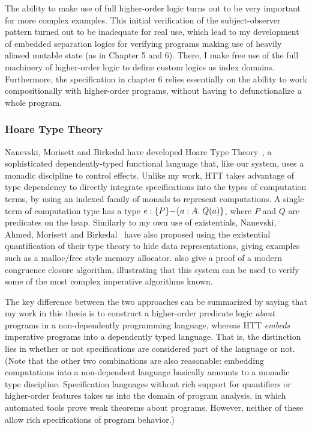 The ability to make use of full higher-order logic turns out to be
very important for more complex examples. This initial verification of
the subject-observer pattern turned out to be inadequate for real use,
which lead to my development of embedded separation logics for
verifying programs making use of heavily aliased mutable state (as in
Chapter 5 and 6). There, I make free use of the full machinery of
higher-order logic to define custom logics as index
domains. Furthermore, the specification in chapter 6 relies
essentially on the ability to work compositionally with higher-order
programs, without having to defunctionalize a whole program.

\subsubsection{Hoare Type Theory}

Nanevski, Morisett and Birkedal have developed Hoare Type
Theory~\cite{htt, nanevski08}, a sophisticated dependently-typed
functional language that, like our system, uses a monadic discipline
to control effects.  Unlike my work, HTT takes advantage of type
dependency to directly integrate specifications into the types of
computation terms, by using an indexed family of monads to represent
computations. A single term of computation type has a type $e :
\{{P}\}{-}\{{a:A}.\;{Q(a)}\}$, where $P$ and $Q$ are predicates on the heap.
Similarly to my own use of existentials, Nanevski, Ahmed, Morisett and
Birkedal~\cite{abstract-htt} have also proposed using the existential
quantification of their type theory to hide data representations,
giving examples such as a malloc/free style memory
allocator. \citet{nanevski-victor-10} also give a proof of a modern
congruence closure algorithm, illustrating that this system can be
used to verify some of the most complex imperative algorithms known.

The key difference between the two approaches can be summarized by
saying that my work in this thesis is to construct a higher-order
predicate logic \emph{about} programs in a non-dependently programming
language, whereas HTT \emph{embeds} imperative programs into a
dependently typed language. That is, the distinction lies in whether
or not specifications are considered part of the language or not.
(Note that the other two combinations are also reasonable: embedding
computations into a non-dependent language basically amounts to a
monadic type discipline. Specification languages without rich support
for quantifiers or higher-order features takes us into the domain of
program analysis, in which automated tools prove weak theorems about
programs. However, neither of these allow rich specifications of
program behavior.)

